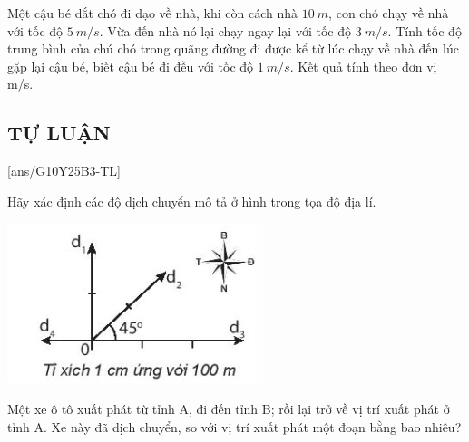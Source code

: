 \begin{ex}
	Một cậu bé dắt chó đi dạo về nhà, khi còn cách nhà $\SI{10}{m}$, con chó chạy về nhà với tốc độ $\SI{5}{m/s}$. Vừa đến nhà nó lại chạy ngay lại với tốc độ $\SI{3}{m/s}$. Tính tốc độ trung bình của chú chó trong quãng đường đi được kể từ lúc chạy về nhà đến lúc gặp lại cậu bé, biết cậu bé đi đều với tốc độ $\SI{1}{m/s}$. Kết quả tính theo đơn vị \si{\meter/\second}.
\end{ex}
\subsection{TỰ LUẬN}
\setcounter{ex}{0}
[ans/G10Y25B3-TL]

\begin{ex}
	Hãy xác định các độ dịch chuyển mô tả ở hình trong tọa độ địa lí.
	
	\begin{center}
		\includegraphics[scale=1]{figs/G10Y25B3-14}
	\end{center}
\end{ex}

\begin{ex}
	Một xe ô tô xuất phát từ tỉnh A, đi đến tỉnh B; rồi lại trở về vị trí xuất phát ở tỉnh A. Xe này đã dịch chuyển, so với vị trí xuất phát một đoạn bằng bao nhiêu? 
\end{ex}

